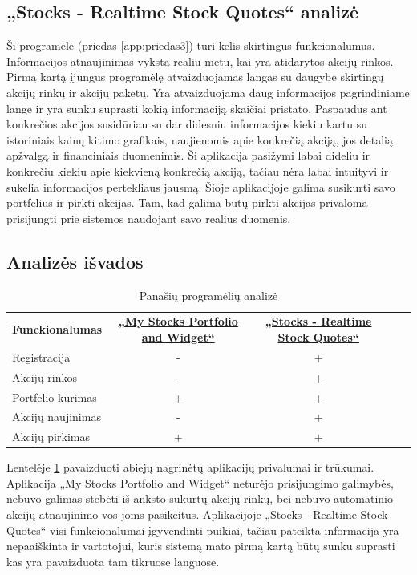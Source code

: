 \documentclass[a4paper,12pt,fleqn]{article}
\begin{document}
\subsection{„Stocks - Realtime Stock Quotes“ analizė}
Ši programėlė (priedas \ref{app:priedas3}) turi kelis skirtingus funkcionalumus.
Informacijos atnaujinimas vyksta realiu metu, kai yra atidarytos akcijų rinkos. Pirmą kartą įjungus programėlę atvaizduojamas langas su daugybe skirtingų akcijų rinkų ir akcijų paketų. Yra atvaizduojama daug informacijos pagrindiniame lange ir yra sunku suprasti kokią informaciją skaičiai pristato. Paspaudus ant konkrečios akcijos susidūriau su dar didesniu informacijos kiekiu kartu su istoriniais kainų kitimo grafikais, naujienomis apie konkrečią akciją, jos detalią apžvalgą ir financiniais duomenimis. Ši aplikacija pasižymi labai dideliu ir konkrečiu kiekiu apie kiekvieną konkrečią akciją, tačiau nėra labai intuityvi ir sukelia informacijos pertekliaus jausmą. Šioje aplikacijoje galima susikurti savo portfelius ir pirkti akcijas. Tam, kad galima būtų pirkti akcijas privaloma prisijungti prie sistemos naudojant savo realius duomenis.
\subsection{Analizės išvados}
\begin{table}[!ht]\centering
	\begin{tabular}{|l|c|c|ll}
		\cline{1-3}
		\textbf{Funckionalumas} & \textbf{\href{https://play.google.com/store/apps/details?id=co.peeksoft.stocks}{„My Stocks Portfolio and Widget“}} & \textbf{\href{https://play.google.com/store/apps/details?id=org.dayup.stocks}{„Stocks - Realtime Stock Quotes“}} &  \\ \cline{1-3}
		Registracija&-&+& \\ \cline{1-3}
		Akcijų rinkos&-&+& \\ \cline{1-3}
		Portfelio kūrimas&+&+& \\ \cline{1-3}
		Akcijų naujinimas&-&+& \\ \cline{1-3}
		Akcijų pirkimas&+&+& \\ \cline{1-3}
	\end{tabular}
	\caption{Panašių programėlių analizė}
	\label{tabl:isvadu-lentele}
\end{table}
Lentelėje \ref{tabl:isvadu-lentele} pavaizduoti abiejų nagrinėtų aplikacijų privalumai ir trūkumai. Aplikacija „My Stocks Portfolio and Widget“ neturėjo prisijungimo galimybės, nebuvo galimas stebėti iš anksto sukurtų akcijų rinkų, bei nebuvo automatinio akcijų atnaujinimo vos joms pasikeitus. Aplikacijoje „Stocks - Realtime Stock Quotes“ visi funkcionalumai įgyvendinti puikiai, tačiau pateikta informacija yra nepaaiškinta ir vartotojui, kuris sistemą mato pirmą kartą būtų sunku suprasti kas yra pavaizduota tam tikruose languose.
 
\end{document}
